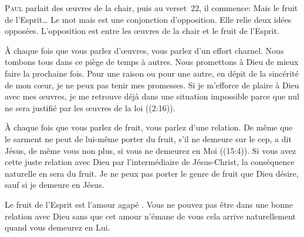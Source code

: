 \dvrule








\lettrine{P}{aul} parlait des \oe{}uvres de la chair,
 puis au verset~22, il commence: 
 \Og Mais le fruit de l'Esprit\dots{} \Fg{}
 Le mot \Og mais \Fg{} est une conjonction d'opposition.
 Elle relie deux idées opposées.
 L'opposition est entre les \oe{}uvres de la chair et le fruit de l'Esprit.

À chaque fois que vous parlez d'\oe{}uvres, vous parlez d'un effort charnel.
 Nous tombons tous dans ce piège de temps à autres. Nous promettons à Dieu
 de mieux faire la prochaine fois. Pour une raison ou pour une autre,
 en dépit de la sincérité de mon c\oe{}ur, je ne peux pas tenir mes promesses.
 Si je m'efforce de plaire à Dieu avec mes \oe{}uvres, je me retrouve déjà
 dans une situation impossible parce que 
 \Og nul ne sera justifié par les \oe{}uvres de la loi \Fg{}
 ((2:16)). 



À chaque fois que vous parlez de fruit, vous parlez d'une relation.
 \Og De même que le sarment ne peut de lui-même porter du fruit,
 s'il ne demeure sur le cep, a dit Jésus, 
 de même vous non plus, si vous ne demeurez en Moi \Fg{}
 ((15:4)).
 Si vous avez cette juste relation avec Dieu par l'intermédiaire de Jésus-Christ,
 la conséquence naturelle en sera du fruit. Je ne peux pas porter
 le genre de fruit que Dieu désire, sauf si je demeure en Jésus.

Le fruit de l'Esprit est l'amour \Og agapé \Fg{}. Vous ne pouvez pas être
 dans une bonne relation avec Dieu sans que cet amour n'émane de vous
 \ocadr cela arrive naturellement quand vous demeurez en Lui.

